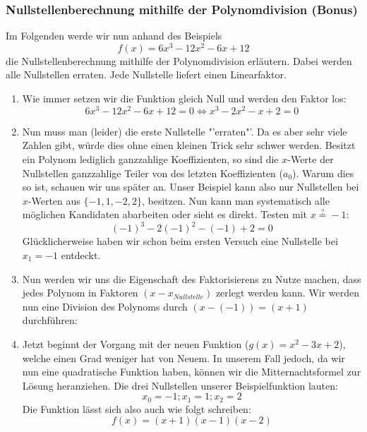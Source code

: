 \subsubsection{Nullstellenberechnung mithilfe der Polynomdivision (Bonus)}
Im Folgenden werde wir nun anhand des Beispiels 
\begin{equation*}
f(x) = 6x^3 - 12x^2 - 6x + 12
\end{equation*}
die Nullstellenberechnung mithilfe der Polynomdivision erläutern. Dabei werden alle Nullstellen erraten. Jede Nullstelle liefert einen Linearfaktor. 
\begin{enumerate}
\item Wie immer setzen wir die Funktion gleich Null und werden den Faktor los:
\begin{equation*}
6x^3 - 12x^2 - 6x + 12 = 0 \iff x^3 -2x^2 - x + 2 = 0
\end{equation*}

\item Nun muss man (leider) die erste Nullstelle "'erraten"'. Da es aber sehr viele Zahlen gibt, würde dies ohne einen kleinen Trick sehr schwer werden. Besitzt ein Polynom lediglich ganzzahlige Koeffizienten, so sind die $x$-Werte der Nullstellen ganzzahlige Teiler von des letzten Koeffizienten ($a_0$). Warum dies so ist, schauen wir uns später an. Unser Beispiel kann also nur Nullstellen bei $x$-Werten aus $\{-1, 1, -2, 2\}$, besitzen. Nun kann man systematisch alle möglichen Kandidaten abarbeiten oder sieht es direkt. Testen mit $x \stackrel{?}{=} -1$:
\begin{equation*}
(-1)^3 - 2(-1)^2 - (-1) + 2 = 0
\end{equation*}
Glücklicherweise haben wir schon beim ersten Versuch eine Nullstelle bei $x_1 = -1$ entdeckt.
\item Nun werden wir uns die Eigenschaft des Faktorisierens zu Nutze machen, dass jedes Polynom in Faktoren $(x-x_{Nullstelle})$ zerlegt werden kann. Wir werden nun eine Division des Polynoms durch $(x-(-1)) = (x + 1)$ durchführen:

\item Jetzt beginnt der Vorgang mit der neuen Funktion ($g(x) = x^2 - 3x + 2$), welche einen Grad weniger hat von Neuem. In unserem Fall jedoch, da wir nun eine quadratische Funktion haben, können wir die Mitternachtsformel zur Lösung heranziehen. Die drei Nullstellen unserer Beispielfunktion lauten:
\begin{equation*}
x_0 = -1; x_1 = 1; x_2 = 2
\end{equation*}
Die Funktion lässt sich also auch wie folgt schreiben:
\begin{equation*}
f(x)=(x+1)(x-1)(x-2)
\end{equation*}
\end{enumerate}
